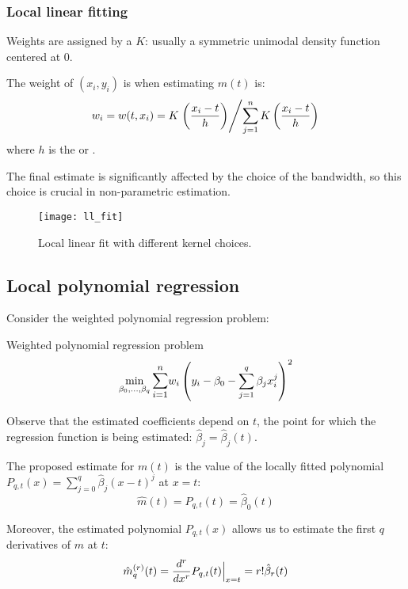 \subsubsection{Local linear fitting}
Weights are assigned by a  $K$: usually a
symmetric unimodal density function centered at $0$.

The weight of $(x_i, y_i)$ is when estimating $m(t)$ is:
\begin{equation*}
	w_i = w(t,x_i) = K \left. \left( \frac{x_i - t}{h} \right) \middle/ \sum_{j=1}^n K \left( \frac{x_i - t}{h} \right) \right.
\end{equation*}
where $h$ is the  or .

\begin{note}
	The final estimate is significantly affected by the choice of the bandwidth, so this
	choice is crucial in non-parametric estimation.
\end{note}

\begin{figure}[H]
	\texttt{[image: ll\_fit]}
	\caption{Local linear fit with different kernel choices.}
\end{figure}

\subsection{Local polynomial regression}
Consider the weighted polynomial regression problem:
\begin{problem}{Weighted polynomial regression problem}{}
\begin{equation*}
	\min_{\beta_0,\ldots,\beta_q} \mathlarger{\sum_{i=1}^n} w_i \left( y_i - \beta_0 - \sum_{j=1}^q \beta_j x_i^j \right)^2
\end{equation*}
\end{problem}
Observe that the estimated coefficients depend on $t$, the
point for which the regression function is being estimated: $\hat\beta_j = \hat\beta_j(t)$.

The proposed estimate for $m(t)$ is the value of the locally fitted
polynomial $P_{q,t}(x) = \sum_{j=0}^q \hat\beta_j(x - t)^j$ at $x = t$:
\begin{equation*}
	\hat{m}(t) = P_{q,t}(t) = \hat\beta_0(t)
\end{equation*}

Moreover, the estimated polynomial $P_{q,t}(x)$ allows us to estimate the first $q$ derivatives
of $m$ at $t$:
\begin{equation*}
	\hat{m}_q^{(r)}(t) = \frac{d^r}{dx^r} P_{q,t}(t) {\Bigm|_{x=t}} = r! \hat\beta_r(t)
\end{equation*}

